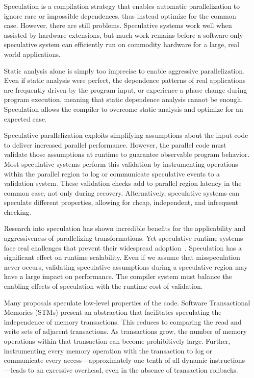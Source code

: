 
Speculation is a compilation strategy that enables automatic parallelization
to ignore rare or impossible dependences, thus instead optimize for the
common case. However, there are still problems.  Speculative systems work
well when assisted by hardware extensions, but much work remains before a
software-only speculative system can efficiently run on commodity hardware
for a large, real world applications.

Static analysis alone is simply too imprecise to enable aggressive
parallelization.  Even if static analysis were perfect, the dependence
patterns of real applications are frequently driven by the program input, or
experience a phase change during program execution, meaning that static
dependence analysis cannot be enough.  Speculation allows the compiler to
overcome static analysis and optimize for an expected case.

Speculative parallelization exploits simplifying assumptions about the
input code to deliver increased parallel performance.  However, the
parallel code must validate those assumptions at runtime to guarantee
observable program behavior.  Most speculative systems perform this
validation by instrumenting operations within the parallel region to
log or communicate speculative events to a validation system.  These
validation checks add to parallel region latency in the common
case, not only during recovery.  Alternatively, speculative systems can
speculate different properties, allowing for cheap, independent,
and infrequent checking.

Research into speculation has shown incredible benefits for the
applicability and aggressiveness of parallelizing transformations. Yet
speculative runtime systems face real challenges that prevent their
widespread adoption~\cite{cascaval:08:stmtoy:short}. Speculation has a
significant effect on runtime scalability.  Even if we assume that
misspeculation never occurs, validating speculative assumptions during a
speculative region may have a large impact on performance. The compiler
system must balance the enabling effects of speculation with the runtime
cost of validation.

Many proposals speculate low-level properties of the code.  Software
Transactional Memories (STMs) present an abstraction that facilitates
speculating the independence of memory transactions.  This reduces to
comparing the read and write sets of adjacent transactions.  As transactions
grow, the number of memory operations within that transaction can become
prohibitively large. Further, instrumenting every memory operation with the
transaction to log or communicate every access---approximately one tenth of
all dynamic instructions---leads to an excessive overhead, even in the
absence of transaction rollbacks.


